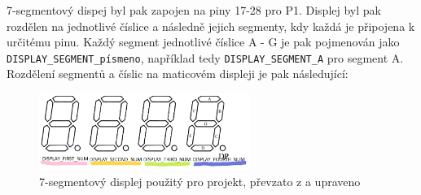\documentclass[a4paper, 11pt]{article}
\begin{document}
7-segmentový dispej byl pak zapojen na piny 17-28 pro P1. Displej byl pak rozdělen na jednotlivé číslice a následně jejich segmenty, kdy každá je připojena k určitému pinu. Každý segment jednotlivé číslice A - G je pak pojmenován jako \verb|DISPLAY_SEGMENT_písmeno|, například tedy \verb|DISPLAY_SEGMENT_A| pro segment A.  Rozdělení segmentů a číslic na maticovém displeji je pak následující:
\begin{figure}[htbp]
    \centering
    \includegraphics[width=260]{disp.png}
     \caption{7-segmentový displej použitý pro projekt, převzato z \cite{Displaydoc:web} a upraveno}
\end{figure}\\
\end{document}
